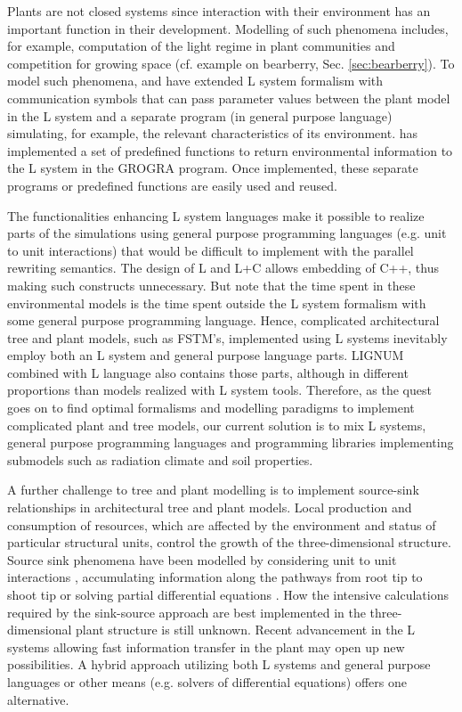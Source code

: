 Plants are not closed systems since interaction with their environment
has  an important function  in their  development.  Modelling  of such
phenomena includes,  for example, computation  of the light  regime in
plant communities  and competition for growing space  (cf.  example on
bearberry,  Sec.   \ref{sec:bearberry}).   To  model  such  phenomena,
\citet{mech:97} and  \citet{mech:96} have extended  L system formalism
with communication symbols that  can pass parameter values between the
plant model in the L system and a separate program (in general purpose
language) simulating, for example, the relevant characteristics of its
environment.   \citet{kurth:94} has  implemented a  set  of predefined
functions to return  environmental information to the L  system in the
GROGRA  program.    Once  implemented,  these   separate  programs  or
predefined functions are easily used and reused.

The functionalities  enhancing L system languages make  it possible to
realize  parts of  the simulations  using general  purpose programming
languages (e.g.  unit to unit interactions) that would be difficult to
implement with the parallel rewriting  semantics.  The design of L and
L+C allows embedding of  C++, thus making such constructs unnecessary.
But note that the time spent in these environmental models is the time
spent  outside  the  L  system  formalism with  some  general  purpose
programming language.  Hence, complicated architectural tree and plant
models, such as FSTM's,  implemented using L systems inevitably employ
both an L system and  general purpose language parts.  LIGNUM combined
with  L language  also  contains those  parts,  although in  different
proportions than  models realized with L system  tools.  Therefore, as
the quest goes  on to find optimal formalisms  and modelling paradigms
to implement  complicated plant and tree models,  our current solution
is  to  mix  L  systems,  general purpose  programming  languages  and
programming libraries implementing submodels such as radiation climate
and soil properties.
 
A  further challenge  to  tree  and plant  modelling  is to  implement
source-sink  relationships  in architectural  tree  and plant  models.
Local production  and consumption of resources, which  are affected by
the environment and status of particular structural units, control the
growth of the three-dimensional structure.  Source sink phenomena have
been   modelled    by   considering   unit    to   unit   interactions
\citep{balandier:00}, accumulating information along the pathways from
root  tip   to  shoot  tip  \citep{dereffye:97}   or  solving  partial
differential  equations  \citep{deleuze:97,  palovaara:03}.   How  the
intensive calculations  required by the sink-source  approach are best
implemented in the three-dimensional plant structure is still unknown.
Recent advancement  in the L systems \citep{karwowski:02,karwowski:03}
allowing  fast information  transfer  in  the plant  may  open up  new
possibilities. A hybrid approach utilizing both L  systems and general
purpose  languages  or  other  means (e.g.   solvers  of  differential
equations) offers one alternative.

